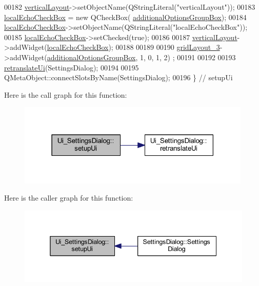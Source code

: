 \begin{DoxyCode}
00182         \hyperlink{a00082_aad19d26806d7e14548233852ac97c26f}{verticalLayout}->setObjectName(QStringLiteral(\textcolor{stringliteral}{"verticalLayout"}));
00183         \hyperlink{a00082_a4cef19b8232e266ba202152ade600263}{localEchoCheckBox} = \textcolor{keyword}{new} QCheckBox(
      \hyperlink{a00082_a996d0cf4818dae895375cb43b996e0dc}{additionalOptionsGroupBox});
00184         \hyperlink{a00082_a4cef19b8232e266ba202152ade600263}{localEchoCheckBox}->setObjectName(QStringLiteral(\textcolor{stringliteral}{"localEchoCheckBox"}));
00185         \hyperlink{a00082_a4cef19b8232e266ba202152ade600263}{localEchoCheckBox}->setChecked(\textcolor{keyword}{true});
00186 
00187         \hyperlink{a00082_aad19d26806d7e14548233852ac97c26f}{verticalLayout}->addWidget(\hyperlink{a00082_a4cef19b8232e266ba202152ade600263}{localEchoCheckBox});
00188 
00189 
00190         \hyperlink{a00082_a2cc53955b73f22f0cfcf508da4654b16}{gridLayout\_3}->addWidget(\hyperlink{a00082_a996d0cf4818dae895375cb43b996e0dc}{additionalOptionsGroupBox}, 1, 0, 1, 2)
      ;
00191 
00192 
00193         \hyperlink{a00082_a7a0adf32eef516ceffcc0633a90c3b34}{retranslateUi}(SettingsDialog);
00194 
00195         QMetaObject::connectSlotsByName(SettingsDialog);
00196     \} \textcolor{comment}{// setupUi}
\end{DoxyCode}


Here is the call graph for this function\+:
\nopagebreak
\begin{figure}[H]
\begin{center}
\leavevmode
\includegraphics[width=316pt]{d4/d63/a00082_a4666ab89748eeb11cdb95d857bd02c6e_cgraph}
\end{center}
\end{figure}




Here is the caller graph for this function\+:
\nopagebreak
\begin{figure}[H]
\begin{center}
\leavevmode
\includegraphics[width=338pt]{d4/d63/a00082_a4666ab89748eeb11cdb95d857bd02c6e_icgraph}
\end{center}
\end{figure}




